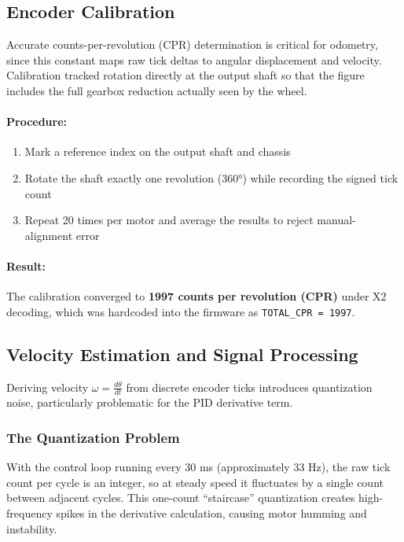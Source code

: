 \subsection{Encoder Calibration}
\label{subsec:encoder_calibration}

Accurate counts-per-revolution (CPR) determination is critical for odometry, since this constant maps raw tick deltas to angular displacement and velocity. Calibration tracked rotation directly at the output shaft so that the figure includes the full gearbox reduction actually seen by the wheel.

\paragraph{Procedure:}
\begin{enumerate}
    \item Mark a reference index on the output shaft and chassis
    \item Rotate the shaft exactly one revolution (360°) while recording the signed tick count
    \item Repeat 20 times per motor and average the results to reject manual-alignment error
\end{enumerate}

\paragraph{Result:} The calibration converged to \textbf{1997 counts per revolution (CPR)} under X2 decoding, which was hardcoded into the firmware as \texttt{TOTAL\_CPR = 1997}.

\subsection{Velocity Estimation and Signal Processing}
\label{subsec:velocity_estimation}

Deriving velocity $\omega = \frac{d\theta}{dt}$ from discrete encoder ticks introduces quantization noise, particularly problematic for the PID derivative term.

\subsubsection{The Quantization Problem}

With the control loop running every 30 ms (approximately 33 Hz), the raw tick count per cycle is an integer, so at steady speed it fluctuates by a single count between adjacent cycles. This one-count ``staircase'' quantization creates high-frequency spikes in the derivative calculation, causing motor humming and instability.

